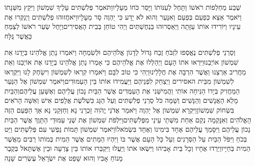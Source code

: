 \documentclass[../main/main.tex]{subfiles}
\begin{document}
\begin{multicols*}{\ncols}
שֶׁבַע מַחְלְפוֹת רֹאשׁוֹ וַתָּחֶל לְעַנּוֹתוֹ וַיָּסַר כֹּחוֹ מֵעָלָיו\PreVerseSpace{}וַתֹּאמֶר פְּלִשְׁתִּים עָלֶיךָ שִׁמְשׁוֹן וַיִּקַץ מִשְּׁנָתוֹ וַיֹּאמֶר אֵצֵא כְּפַעַם בְּפַעַם וְאִנָּעֵר וְהוּא לֹא יָדַע כִּי יַהְוֶה סָר מֵעָלָיו\PreVerseSpace{}וַיֹּאחֲזוּהוּ פְלִשְׁתִּים וַיְנַקְּרוּ אֶת עֵינָיו וַיּוֹרִידוּ אוֹתוֹ עַזָּתָה וַיַּאַסְרוּהוּ בַּנְחֻשְׁתַּיִם וַיְהִי טוֹחֵן בְּבֵית הָאֲסִירִים\PreVerseSpace{}וַיָּחֶל שְׂעַר רֹאשׁוֹ לְצַמֵּחַ כַּאֲשֶׁר גֻּלָּח\OpenSection{}\par
{}וְסַרְנֵי פְלִשְׁתִּים נֶאֱסְפוּ לִזְבֹּחַ זֶבַח גָּדוֹל לְדָגוֹן אֱלֹהֵיהֶם וּלְשִׂמְחָה וַיֹּאמְרוּ נָתַן אֱלֹהֵינוּ בְּיָדֵנוּ אֵת שִׁמְשׁוֹן אוֹיְבֵנוּ\PreVerseSpace{}וַיִּרְאוּ אֹתוֹ הָעָם וַיְהַלְלוּ אֶת אֱלֹהֵיהֶם כִּי אָמְרוּ נָתַן אֱלֹהֵינוּ בְיָדֵנוּ אֶת אוֹיְבֵנוּ וְאֵת מַחֲרִיב אַרְצֵנוּ וַאֲשֶׁר הִרְבָּה אֶת חֲלָלֵינוּ\PreVerseSpace{}וַיְהִי כִּי טוֹב לִבָּם וַיֹּאמְרוּ קִרְאוּ לְשִׁמְשׁוֹן וִישַׂחֶק לָנוּ וַיִּקְרְאוּ לְשִׁמְשׁוֹן מִבֵּית האסירים וַיְצַחֵק לִפְנֵיהֶם וַיַּעֲמִידוּ אוֹתוֹ בֵּין הָעַמּוּדִים\PreVerseSpace{}וַיֹּאמֶר שִׁמְשׁוֹן אֶל הַנַּעַר הַמַּחֲזִיק בְּיָדוֹ הַנִּיחָה אוֹתִי וַהֲמִישֵּׁנִי\SubEnd{} אֶת הָעַמֻּדִים אֲשֶׁר הַבַּיִת נָכוֹן עֲלֵיהֶם וְאֶשָּׁעֵן עֲלֵיהֶם\PreVerseSpace{}וְהַבַּיִת מָלֵא הָאֲנָשִׁים וְהַנָּשִׁים וְשָׁמָּה כֹּל סַרְנֵי פְלִשְׁתִּים וְעַל הַגָּג כִּשְׁלֹשֶׁת אֲלָפִים אִישׁ וְאִשָּׁה הָרֹאִים בִּשְׂחוֹק שִׁמְשׁוֹן\PreVerseSpace{}וַיִּקְרָא שִׁמְשׁוֹן אֶל יַהְוֶה וַיֹּאמַר אֲדֹנַי יֱהֹוִה זָכְרֵנִי נָא וְחַזְּקֵנִי נָא אַךְ הַפַּעַם הַזֶּה הָאֱלֹהִים וְאִנָּקְמָה נְקַם אַחַת מִשְּׁתֵי עֵינַי מִפְּלִשְׁתִּים\PreVerseSpace{}וַיִּלְפֹּת שִׁמְשׁוֹן אֶת שְׁנֵי עַמּוּדֵי הַתָּוֶךְ אֲשֶׁר הַבַּיִת נָכוֹן עֲלֵיהֶם וַיִּסָּמֵךְ עֲלֵיהֶם אֶחָד בִּימִינוֹ וְאֶחָד בִּשְׂמֹאלוֹ\PreVerseSpace{}וַיֹּאמֶר שִׁמְשׁוֹן תָּמוֹת נַפְשִׁי עִם פְּלִשְׁתִּים וַיֵּט בְּכֹחַ וַיִּפֹּל הַבַּיִת עַל הַסְּרָנִים וְעַל כָּל הָעָם אֲשֶׁר בּוֹ וַיִּהְיוּ הַמֵּתִים אֲשֶׁר הֵמִית בְּמוֹתוֹ רַבִּים מֵאֲשֶׁר הֵמִית בְּחַיָּיו\PreVerseSpace{}וַיֵּרְדוּ אֶחָיו וְכָל בֵּית אָבִיהוּ וַיִּשְׂאוּ אֹתוֹ וַיַּעֲלוּ וַיִּקְבְּרוּ אוֹתוֹ בֵּין צָרְעָה וּבֵין אֶשְׁתָּאֹל בְּקֶבֶר מָנוֹחַ אָבִיו וְהוּא שָׁפַט אֶת יִשְׂרָאֵל עֶשְׂרִים שָׁנָה\OpenSection{}\par

\end{multicols*}
\end{document}
